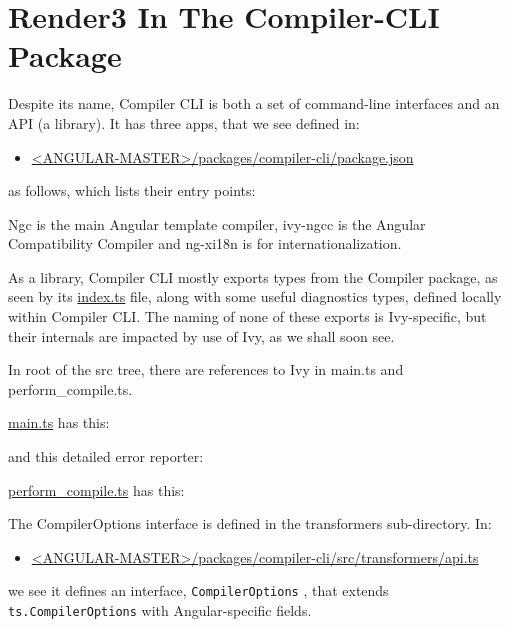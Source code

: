 \section{Render3 In The Compiler-CLI Package}

Despite its name, Compiler CLI is both a set of command-line interfaces and an API (a
library). It has three apps, that we see defined in:

\begin{itemize}
  \item \href{https://github.com/angular/angular/blob/master/packages/compiler-cli/package.json}
        {<ANGULAR-MASTER>/packages/compiler-cli/package.json}
\end{itemize}

as follows, which lists their entry points:



Ngc is the main Angular template compiler, ivy-ngcc is the Angular Compatibility
Compiler and ng-xi18n is for internationalization.

As a library, Compiler CLI mostly exports types from the Compiler package, as seen
by its
\url{index.ts}
file, along with some useful diagnostics types, defined locally within
Compiler CLI. The naming of none of these exports is Ivy-specific, but their internals
are impacted by use of Ivy, as we shall soon see.

In root of the src tree, there are references to Ivy in main.ts and perform\_compile.ts.

\url{main.ts}
has this:



and this detailed error reporter:



\url{perform_compile.ts}
has this:



The CompilerOptions interface is defined in the transformers sub-directory. In:

\begin{itemize}
  \item \href{https://github.com/angular/angular/blob/master/packages/compiler-cli/src/transformers/api.ts}
        {<ANGULAR-MASTER>/packages/compiler-cli/src/transformers/api.ts}
\end{itemize}

we see it defines an interface,
\texttt{CompilerOptions}
, that extends
\texttt{ts.CompilerOptions}
with Angular-specific fields.

